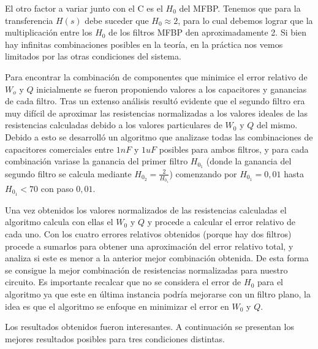 \documentclass[11pt,a4paper]{report}
\begin{document}
\bigskip
El otro factor a variar junto con el C es el $H_{0}$ del MFBP. Tenemos que para la transferencia $H(s)$ debe suceder que $H_{0} \approx 2$, para lo cual debemos lograr que la multiplicación entre los $H_{0}$ de los filtros MFBP den aproximadamente 2. Si bien hay infinitas combinaciones posibles en la teoría, en la práctica nos vemos limitados por las otras condiciones del sistema. 

\bigskip
Para encontrar la combinación de componentes que minimice el error relativo de $W_{o}$ y $Q$ inicialmente se fueron proponiendo valores a los capacitores y ganancias de cada filtro. Tras un extenso análisis resultó evidente que el segundo filtro era muy difícil de aproximar las resistencias normalizadas a los valores ideales de las resistencias calculadas debido a los valores particulares de $W_{0}$ y $Q$ del mismo. Debido a esto se desarrolló un algoritmo que analizase todas las combinaciones de capacitores comerciales entre $1nF$ y $1uF$ posibles para ambos filtros, y para cada combinación variase la ganancia del primer filtro $H_{0_{1}}$ (donde la ganancia del segundo filtro se calcula mediante $H_{0_{2}} = \frac{2}{H_{0_{1}}}$) comenzando por $H_{0_{1}} = 0,01$ hasta $H_{0_{1}} < 70$ con paso $0,01$. 

\bigskip
Una vez obtenidos los valores normalizados de las resistencias calculadas el algoritmo calcula con ellas el $W_{0}$ y $Q$ y procede a calcular el error relativo de cada uno. Con los cuatro errores relativos obtenidos (porque hay dos filtros) procede a sumarlos para obtener una aproximación del error relativo total, y analiza si este es menor a la anterior mejor combinación obtenida. De esta forma se consigue la mejor combinación de resistencias normalizadas para nuestro circuito.
Es importante recalcar que no se considera el error de $H_{0}$ para el algoritmo ya que este en última instancia podría mejorarse con un filtro plano, la idea es que el algoritmo se enfoque en minimizar el error en $W_{0}$ y $Q$.

\bigskip
Los resultados obtenidos fueron interesantes. A continuación se presentan los mejores resultados posibles para tres condiciones distintas.
\end{document}
